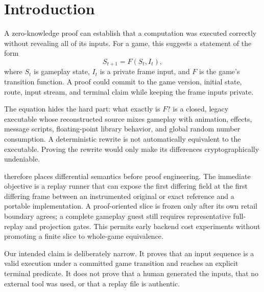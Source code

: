 \section{Introduction}

A zero-knowledge proof can establish that a computation was executed correctly
without revealing all of its inputs.  For a game, this suggests a statement of
the form
\[
  S_{t+1} = F(S_t, I_t),
\]
where $S_t$ is gameplay state, $I_t$ is a private frame input, and $F$ is the
game's transition function.  A proof could commit to the game version, initial
state, route, input stream, and terminal claim while keeping the frame inputs
private.

The equation hides the hard part: what exactly is $F$?  \thgame{} is a closed,
legacy executable whose reconstructed source mixes gameplay with animation,
effects, message scripts, floating-point library behavior, and global random
number consumption.  A deterministic rewrite is not automatically equivalent
to the executable.  Proving the rewrite would only make its differences
cryptographically undeniable.

\project{} therefore places differential semantics before proof engineering.
The immediate objective is a replay runner that can expose the first differing
field at the first differing frame between an instrumented original or exact
reference and a portable implementation.  A proof-oriented slice is frozen
only after its own retail boundary agrees; a complete gameplay guest still
requires representative full-replay and projection gates.  This permits early
backend cost experiments without promoting a finite slice to whole-game
equivalence.

Our intended claim is deliberately narrow.  It proves that an input sequence is
a valid execution under a committed game transition and reaches an explicit
terminal predicate.  It does not prove that a human generated the inputs, that
no external tool was used, or that a replay file is authentic.
